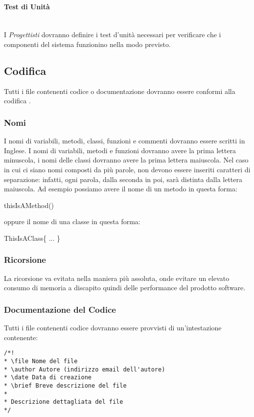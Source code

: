 \paragraph{Test di Unità}\mbox{}\\
I \textit{Progettisti} dovranno definire i test d'unità necessari per verificare che i componenti del sistema funzionino nella modo previsto.

\subsection{Codifica}
Tutti i file contenenti codice o documentazione dovranno essere conformi alla codifica .

\subsubsection{Nomi}
I nomi di variabili, metodi, classi, funzioni e commenti dovranno essere scritti in Inglese. I nomi di variabili, metodi e funzioni dovranno avere la prima lettera minuscola, i nomi delle classi dovranno avere la prima lettera maiuscola. Nel caso in cui ci siano nomi composti da più parole, non devono essere inseriti caratteri di separazione: infatti, ogni parola, dalla seconda in poi, sarà distinta dalla lettera maiuscola. Ad esempio possiamo avere il nome di un metodo in questa forma:
\begin{center}
thisIsAMethod()
\end{center}
oppure il nome di una classe in questa forma:
\begin{center}
ThisIsAClass\{ ... \}
\end{center}

\subsubsection{Ricorsione}
La ricorsione va evitata nella maniera più assoluta, onde evitare un elevato consumo di memoria a discapito quindi delle performance del prodotto software. 

\subsubsection{Documentazione del Codice}
Tutti i file contenenti codice dovranno essere provvisti di un'intestazione contenente:
\begin{lstlisting}
/*!
* \file Nome del file 
* \author Autore (indirizzo email dell'autore) 
* \date Data di creazione 
* \brief Breve descrizione del file 
* 
* Descrizione dettagliata del file 
*/
\end{lstlisting}

